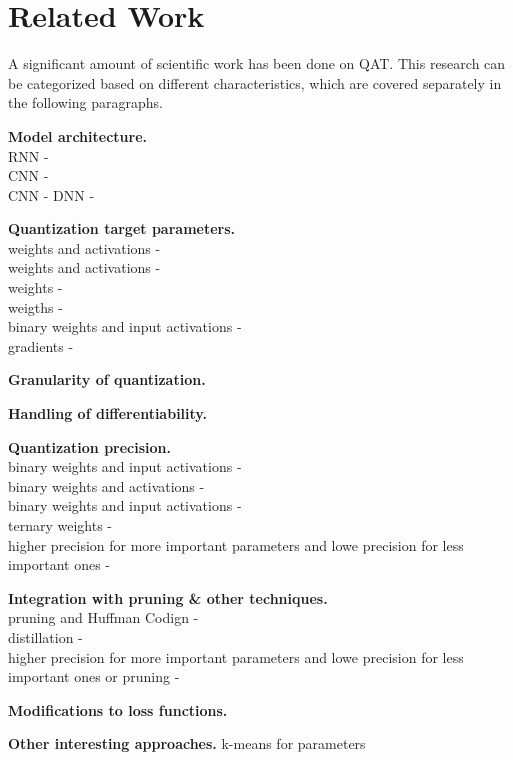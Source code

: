 \chapter{Related Work\label{cha:chapter5}}

A significant amount of scientific work has been done on QAT. 
This research can be categorized based on different characteristics, 
which are covered separately in the following paragraphs.

\noindent
\textbf{Model architecture.}\\
RNN - \cite{ott2016rnn}\\
CNN - \cite{rastegari2016xnor}\\
CNN - \cite{courbariaux2015binaryconnect}
DNN - \cite{yunchao2014compressing}

\noindent
\textbf{Quantization target parameters.}\\
weights and activations - \cite{krishnamoorthi2018quantizing}\\
weights and activations - \cite{hubara2016qnn}\\
weights - \cite{polino2018modelcompression}\\
weigths - \cite{ott2016rnn}\\
binary weights and input activations - \cite{rastegari2016xnor}\\
gradients - \cite{shuchang2016dorafenet}


\noindent
\textbf{Granularity of quantization.}

\noindent
\textbf{Handling of differentiability.}

\noindent
\textbf{Quantization precision.}\\
binary weights and input activations - \cite{courbariaux2015binaryconnect}\\
binary weights and activations - \cite{hubara2016qnn}\\
binary weights and input activations - \cite{rastegari2016xnor}\\
ternary weights - \cite{ott2016rnn}\\
higher precision for more important parameters and lowe precision for less important ones - \cite{soroosh2018adaptive}

\noindent
\textbf{Integration with pruning \& other techniques.}\\
pruning and Huffman Codign - \cite{han2016deepcompression}\\
distillation - \cite{polino2018modelcompression}\\
higher precision for more important parameters and lowe precision for less important ones or pruning - \cite{soroosh2018adaptive}

\noindent
\textbf{Modifications to loss functions.}

\noindent
\textbf{Other interesting approaches.}
k-means for parameters \cite{yunchao2014compressing}
